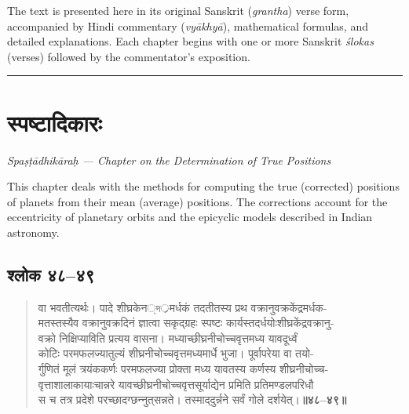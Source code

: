 \documentclass[11pt,a4paper]{article}
\newcommand{\longline}{\noindent\rule{\textwidth}{0.4pt}}
\newcommand{\dev}[1]{{\devanagarifont #1}}
\newcommand{\vs}[1]{\textcolor{vernumcolor}{\textbf{#1}}}
\newenvironment{shloka}{%
  \begin{quote}
  \small
  \setlength{\leftmargin}{2em}
  \devanagarifont
}{\end{quote}}
\begin{document}
The text is presented here in its original Sanskrit (\textit{grantha}) verse form, accompanied by Hindi commentary (\textit{vyākhyā}), mathematical formulas, and detailed explanations. Each chapter begins with one or more Sanskrit \textit{ślokas} (verses) followed by the commentator's exposition.

\longline

\section{\dev{स्पष्टादिकारः}}

\begin{center}
\textit{Spaṣṭādhikāraḥ — Chapter on the Determination of True Positions}
\end{center}

This chapter deals with the methods for computing the true (corrected) positions of planets from their mean (average) positions. The corrections account for the eccentricity of planetary orbits and the epicyclic models described in Indian astronomy.

\subsection{\dev{श्लोक ४८--४९}}

\begin{shloka}
वा भवतीत्यर्थः। पादे शीघ्रकेन্দ्रमर्धकं तदतीतस्य प्रथ वक्रानुवक्रकेंद्रमर्धक-\\
मतस्तस्यैव वक्रानुवक्रदिनं ज्ञात्वा सकृद्‌ग्रहः स्पष्टः कार्यस्तदर्धयोःशीघ्रकेंद्रवक्रानु-\\
वक्रो निक्षिप्याविति प्रत्यय वासना। मध्याच्छीघ्रनीचोच्चवृत्तमध्य यावदूर्ध्वं\\
कोटिः परमफलज्यातुल्यं शीघ्रनीचोच्चवृत्तमध्यमार्धे भुजा। पूर्वापरेया वा तयो-\\
र्गुणितं मूलं त्रयंककर्णः परमफलज्या प्रोक्ता मध्य यावतस्य कर्णस्य शीघ्रनीचोच्च-\\
वृत्ताशालाकायाःचान्नरे यावच्छीघ्रनीचोच्चवृत्तसूर्याद्येन प्रमिति प्रतिमण्डलपरिधौ\\
स च तत्र प्रदेशे परच्छादग्छन्‍नुत्‌सन्नते। तस्माद्‌दुर्न्नने सर्वं गोले दर्शयेत्।\space\space\vs{॥४८--४९॥}
\end{shloka}
\end{document}
